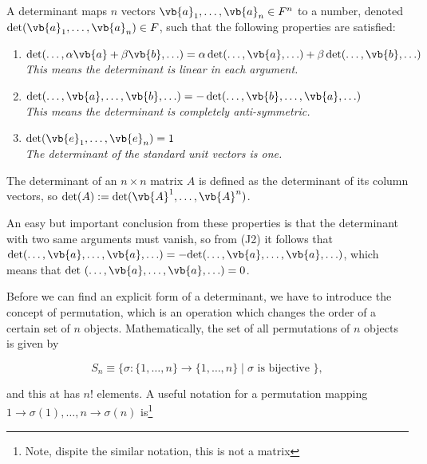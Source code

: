 \documentclass[a4paper,12pt]{report}
\begin{document}
\begin{definition}
    A determinant maps \( n \) vectors \(\vb{a}_1, \ldots, \vb{a}_n \in F^n\) to a number, denoted \(\det(\vb{a}_1, \ldots, \vb{a}_n) \in F\), such that the following properties are satisfied:
    \begin{enumerate}[label=(J\arabic*)]
        \item \(\det(\ldots, \alpha \vb{a} + \beta \vb{b}, \ldots) = \alpha \det(\ldots, \vb{a}, \ldots) + \beta \det(\ldots, \vb{b}, \ldots)\)\\
        \textit{This means the determinant is linear in each argument.}
        
        \item \(\det(\ldots, \vb{a}, \ldots, \vb{b}, \ldots) = -\det(\ldots, \vb{b}, \ldots, \vb{a}, \ldots)\)\\
        \textit{This means the determinant is completely anti-symmetric.}
        
        \item \(\det(\vb{e}_1, \ldots, \vb{e}_n) = 1\)\\
        \textit{The determinant of the standard unit vectors is one.}
    \end{enumerate}
    The determinant of an \( n \times n \) matrix \( A \) is defined as the determinant of its column vectors, so \(\det(A) := \det(\vb{A}^1, \ldots, \vb{A}^n)\).
\end{definition}

An easy but important conclusion from these properties is that the determinant with two same arguments must vanish, so from (J2) it follows that \(\text{det}(\ldots , \vb{a} , \ldots , \vb{a} , \ldots ) = - \text{det}(\ldots ,\vb{a} ,\ldots ,\vb{a} ,\ldots )  \), which means that \(\text{det }(\ldots , \vb{a} ,\ldots ,\vb{a} ,\ldots ) = 0  \). 

Before we can find an explicit form of a determinant, we have to introduce the concept of permutation, which is an operation which changes the order of a certain set of \(n\) objects. Mathematically, the set of all permutations of \(n\) objects is given by 

\begin{equation}
    S_{n} \equiv \{\sigma : \{1,\ldots ,n\} \rightarrow \{1,\ldots ,n\} \mid  \sigma \text{ is bijective } \}, 
\end{equation}

and this at has \(n!\) elements. A useful notation for a permutation mapping \(1 \rightarrow  \sigma (1), \ldots , n \rightarrow \sigma (n)\) is\footnote{Note, dispite the similar notation, this is not a matrix}
\end{document}
